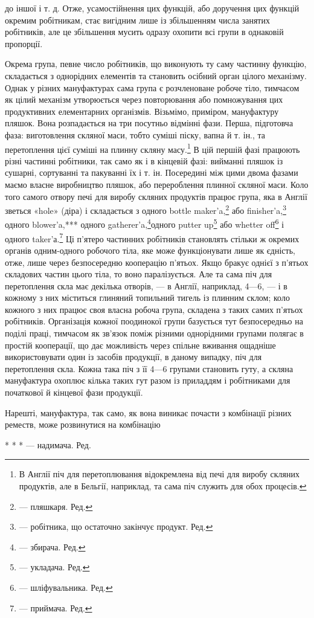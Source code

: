 \parcont{}  %
до іншої і т. д. Отже, усамостійнення цих функцій, або доручення
цих функцій окремим робітникам, стає вигідним лише із збільшенням
числа занятих робітників, але це збільшення мусить
одразу охопити всі групи в однаковій пропорції.

Окрема група, певне число робітників, що виконують ту саму
частинну функцію, складається з однорідних елементів та становить
осібний орган цілого механізму. Однак у різних мануфактурах
сама група є розчленоване робоче тіло, тимчасом як цілий
механізм утворюється через повторювання або помножування
цих продуктивних елементарних організмів. Візьмімо, приміром,
мануфактуру пляшок. Вона розпадається на три посутньо відмінні
фази. Перша, підготовча фаза: виготовлення скляної маси,
тобто суміші піску, вапна й т. ін., та перетоплення цієї суміші
на плинну скляну масу.\footnote{
В Англії піч для перетоплювання відокремлена від печі для виробу
скляних продуктів, але в Бельгії, наприклад, та сама піч служить
для обох процесів.
} В цій першій фазі працюють різні
частинні робітники, так само як і в кінцевій фазі: вийманні
пляшок із сушарні, сортуванні та пакуванні їх і т. ін. Посередині
між цими двома фазами маємо власне виробництво пляшок, або
перероблення плинної скляної маси. Коло того самого отвору
печі для виробу скляних продуктів працює група, яка в Англії
зветься «hole» (діра) і складається з одного bottle maker’a,\footnote*{
— пляшкаря. Ред.
}
або finisher’a,\footnote*{
— робітника, що остаточно закінчує продукт. Ред.
} одного blower’a,*** одного gatherer’a,\footnote*{
— збирача. Ред.
}одного
putter up\footnote*{
— укладача. Ред.
} або whetter off\footnote*{
— шліфувальника. Ред.
} і одного taker’а.\footnote*{
— приймача. Ред.
}
Ці п’ятеро частинних робітників становлять стільки ж окремих
органів одним-одного робочого тіла, яке може функціонувати лише
як єдність, отже, лише через безпосередню кооперацію п’ятьох.
Якщо бракує однієї з п’ятьох складових частин цього тіла, то
воно паралізується. Але та сама піч для перетоплення скла має декілька
отворів, — в Англії, наприклад, 4—6, — і в кожному з них
міститься глиняний топильний тигель із плинним склом; коло кожного
з них працює своя власна робоча група, складена з таких самих
п’ятьох робітників. Організація кожної поодинокої групи базується
тут безпосередньо на поділі праці, тимчасом як зв’язок поміж
різними однорідними групами полягає в простій кооперації,
що дає можливість через спільне вживання ощадніше використовувати
один із засобів продукції, в даному випадку, піч для перетоплення
скла. Кожна така піч з її 4—6 групами становить гуту,
а скляна мануфактура охоплює кілька таких гут разом із приладдям
і робітниками для початкової й кінцевої фази продукції.

Нарешті, мануфактура, так само, як вона виникає почасти
з комбінації різних реместв, може розвинутися на комбінацію

* * * — надимача. Ред.
\parbreak{}  %
